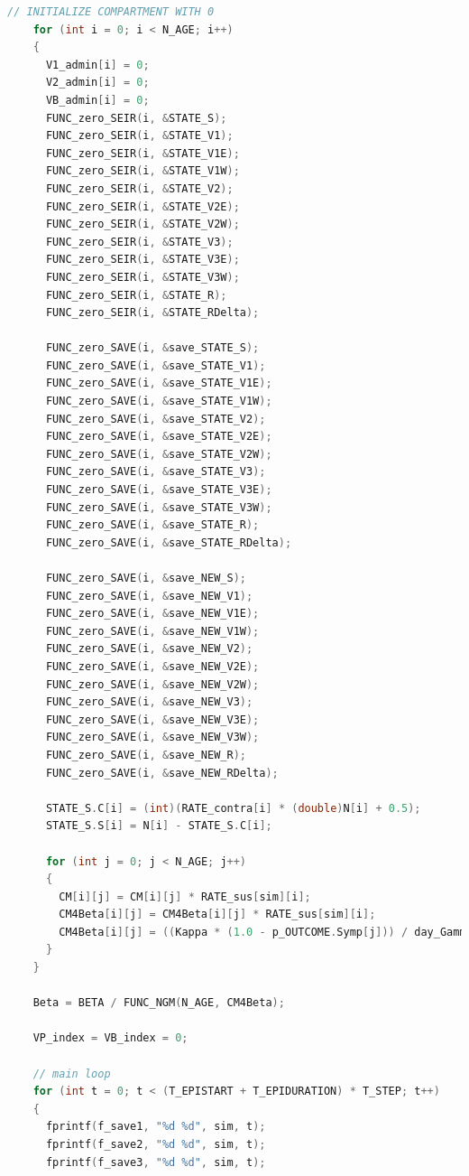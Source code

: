 \documentclass[bwprint]{gmcmthesis}
\numberwithin{figure}{section}
\begin{document}
\begin{lstlisting}[language=C]
    // INITIALIZE COMPARTMENT WITH 0
    for (int i = 0; i < N_AGE; i++)
    {
      V1_admin[i] = 0;
      V2_admin[i] = 0;
      VB_admin[i] = 0;
      FUNC_zero_SEIR(i, &STATE_S);
      FUNC_zero_SEIR(i, &STATE_V1);
      FUNC_zero_SEIR(i, &STATE_V1E);
      FUNC_zero_SEIR(i, &STATE_V1W);
      FUNC_zero_SEIR(i, &STATE_V2);
      FUNC_zero_SEIR(i, &STATE_V2E);
      FUNC_zero_SEIR(i, &STATE_V2W);
      FUNC_zero_SEIR(i, &STATE_V3);
      FUNC_zero_SEIR(i, &STATE_V3E);
      FUNC_zero_SEIR(i, &STATE_V3W);
      FUNC_zero_SEIR(i, &STATE_R);
      FUNC_zero_SEIR(i, &STATE_RDelta);

      FUNC_zero_SAVE(i, &save_STATE_S);
      FUNC_zero_SAVE(i, &save_STATE_V1);
      FUNC_zero_SAVE(i, &save_STATE_V1E);
      FUNC_zero_SAVE(i, &save_STATE_V1W);
      FUNC_zero_SAVE(i, &save_STATE_V2);
      FUNC_zero_SAVE(i, &save_STATE_V2E);
      FUNC_zero_SAVE(i, &save_STATE_V2W);
      FUNC_zero_SAVE(i, &save_STATE_V3);
      FUNC_zero_SAVE(i, &save_STATE_V3E);
      FUNC_zero_SAVE(i, &save_STATE_V3W);
      FUNC_zero_SAVE(i, &save_STATE_R);
      FUNC_zero_SAVE(i, &save_STATE_RDelta);

      FUNC_zero_SAVE(i, &save_NEW_S);
      FUNC_zero_SAVE(i, &save_NEW_V1);
      FUNC_zero_SAVE(i, &save_NEW_V1E);
      FUNC_zero_SAVE(i, &save_NEW_V1W);
      FUNC_zero_SAVE(i, &save_NEW_V2);
      FUNC_zero_SAVE(i, &save_NEW_V2E);
      FUNC_zero_SAVE(i, &save_NEW_V2W);
      FUNC_zero_SAVE(i, &save_NEW_V3);
      FUNC_zero_SAVE(i, &save_NEW_V3E);
      FUNC_zero_SAVE(i, &save_NEW_V3W);
      FUNC_zero_SAVE(i, &save_NEW_R);
      FUNC_zero_SAVE(i, &save_NEW_RDelta);

      STATE_S.C[i] = (int)(RATE_contra[i] * (double)N[i] + 0.5);
      STATE_S.S[i] = N[i] - STATE_S.C[i];

      for (int j = 0; j < N_AGE; j++)
      {
        CM[i][j] = CM[i][j] * RATE_sus[sim][i];
        CM4Beta[i][j] = CM4Beta[i][j] * RATE_sus[sim][i];
        CM4Beta[i][j] = ((Kappa * (1.0 - p_OUTCOME.Symp[j])) / day_Gamma.I2R + p_OUTCOME.Symp[j] / (day_Gamma.I2R * (1.0 - p_OUTCOME.Hosp[j]) + day_Gamma.Is2H * p_OUTCOME.Hosp[j])) * CM4Beta[i][j] * N[i] / N[j];
      }
    }

    Beta = BETA / FUNC_NGM(N_AGE, CM4Beta);

    VP_index = VB_index = 0;

    // main loop
    for (int t = 0; t < (T_EPISTART + T_EPIDURATION) * T_STEP; t++)
    {
      fprintf(f_save1, "%d %d", sim, t);
      fprintf(f_save2, "%d %d", sim, t);
      fprintf(f_save3, "%d %d", sim, t);


\end{lstlisting}
\end{document}
